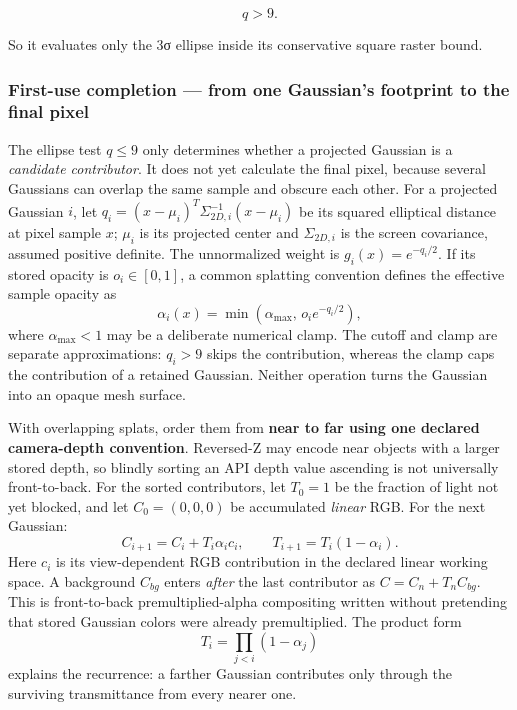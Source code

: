 \[
q>9.
\]

So it evaluates only the 3σ ellipse inside its conservative square raster bound.

\subsubsection{First-use completion --- from one Gaussian's footprint to the final pixel}\label{04-visual-computing-ii-ch038-first-use-completion-from-one-gaussians-footprint-to-the-final-pixel}

\hypertarget{04-visual-computing-ii-ch038-first-use-completion-from-one-gaussians-footprint-to-the-final-pixel}{}

The ellipse test \(q\leq9\) only determines whether a projected Gaussian is a \emph{candidate contributor}. It does not yet calculate the final pixel, because several Gaussians can overlap the same sample and obscure each other. For a projected Gaussian \(i\), let \(q_i=(x-\mu_i)^T\Sigma_{2D,i}^{-1}(x-\mu_i)\) be its squared elliptical distance at pixel sample \(x\); \(\mu_i\) is its projected center and \(\Sigma_{2D,i}\) is the screen covariance, assumed positive definite. The unnormalized weight is \(g_i(x)=e^{-q_i/2}\). If its stored opacity is \(o_i\in[0,1]\), a common splatting convention defines the effective sample opacity as \[
\alpha_i(x)=\min(\alpha_{\max},\,o_i e^{-q_i/2}),
\] where \(\alpha_{\max}<1\) may be a deliberate numerical clamp. The cutoff and clamp are separate approximations: \(q_i>9\) skips the contribution, whereas the clamp caps the contribution of a retained Gaussian. Neither operation turns the Gaussian into an opaque mesh surface.

With overlapping splats, order them from \textbf{near to far using one declared camera-depth convention}. Reversed-Z may encode near objects with a larger stored depth, so blindly sorting an API depth value ascending is not universally front-to-back. For the sorted contributors, let \(T_0=1\) be the fraction of light not yet blocked, and let \(C_0=(0,0,0)\) be accumulated \emph{linear} RGB. For the next Gaussian: \[
C_{i+1}=C_i+T_i\alpha_i c_i,\qquad
T_{i+1}=T_i(1-\alpha_i).
\] Here \(c_i\) is its view-dependent RGB contribution in the declared linear working space. A background \(C_{bg}\) enters \emph{after} the last contributor as \(C=C_n+T_n C_{bg}\). This is front-to-back premultiplied-alpha compositing written without pretending that stored Gaussian colors were already premultiplied. The product form \[
T_i=\prod_{j<i}(1-\alpha_j)
\] explains the recurrence: a farther Gaussian contributes only through the surviving transmittance from every nearer one.

